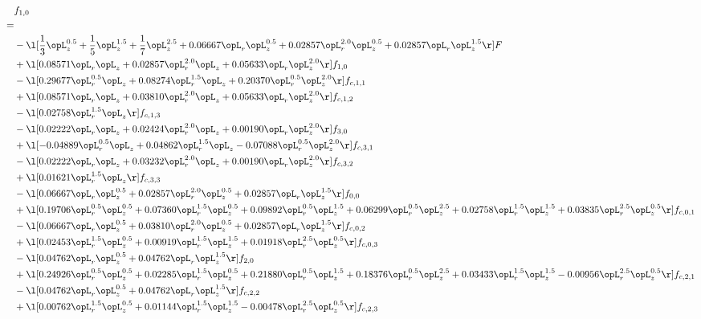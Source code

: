 \begin{alignat}{2} 
\label{eq:f_10_1} 
& f_{1,0} \nonumber \\ 
 = \\ 
& - \l[ \frac{1}{3} \opL_z^{0.5} + \frac{1}{5} \opL_z^{1.5} + \frac{1}{7} \opL_z^{2.5} +  0.06667 \opL_r \opL_z^{0.5} +  0.02857 \opL_r^{2.0} \opL_z^{0.5} +  0.02857 \opL_r \opL_z^{1.5}  \r] F \nonumber \\ 
& + \l[  0.08571 \opL_r \opL_z +  0.02857 \opL_r^{2.0} \opL_z +  0.05633 \opL_r \opL_z^{2.0}  \r] f_{1,0} \nonumber \\ 
& - \l[  0.29677 \opL_r^{0.5} \opL_z +  0.08274 \opL_r^{1.5} \opL_z +  0.20370 \opL_r^{0.5} \opL_z^{2.0}  \r] f_{c,1,1} \nonumber \\ 
& + \l[  0.08571 \opL_r \opL_z +  0.03810 \opL_r^{2.0} \opL_z +  0.05633 \opL_r \opL_z^{2.0}  \r] f_{c,1,2} \nonumber \\ 
& - \l[  0.02758 \opL_r^{1.5} \opL_z  \r] f_{c,1,3} \nonumber \\ 
& - \l[  0.02222 \opL_r \opL_z +  0.02424 \opL_r^{2.0} \opL_z +  0.00190 \opL_r \opL_z^{2.0}  \r] f_{3,0} \nonumber \\ 
& + \l[  -0.04889 \opL_r^{0.5} \opL_z +  0.04862 \opL_r^{1.5} \opL_z   -0.07088 \opL_r^{0.5} \opL_z^{2.0}  \r] f_{c,3,1} \nonumber \\ 
& - \l[  0.02222 \opL_r \opL_z +  0.03232 \opL_r^{2.0} \opL_z +  0.00190 \opL_r \opL_z^{2.0}  \r] f_{c,3,2} \nonumber \\ 
& + \l[  0.01621 \opL_r^{1.5} \opL_z  \r] f_{c,3,3} \nonumber \\ 
& - \l[  0.06667 \opL_r \opL_z^{0.5} +  0.02857 \opL_r^{2.0} \opL_z^{0.5} +  0.02857 \opL_r \opL_z^{1.5}  \r] f_{0,0} \nonumber \\ 
& + \l[  0.19706 \opL_r^{0.5} \opL_z^{0.5} +  0.07360 \opL_r^{1.5} \opL_z^{0.5} +  0.09892 \opL_r^{0.5} \opL_z^{1.5} +  0.06299 \opL_r^{0.5} \opL_z^{2.5} +  0.02758 \opL_r^{1.5} \opL_z^{1.5} +  0.03835 \opL_r^{2.5} \opL_z^{0.5}  \r] f_{c,0,1} \nonumber \\ 
& - \l[  0.06667 \opL_r \opL_z^{0.5} +  0.03810 \opL_r^{2.0} \opL_z^{0.5} +  0.02857 \opL_r \opL_z^{1.5}  \r] f_{c,0,2} \nonumber \\ 
& + \l[  0.02453 \opL_r^{1.5} \opL_z^{0.5} +  0.00919 \opL_r^{1.5} \opL_z^{1.5} +  0.01918 \opL_r^{2.5} \opL_z^{0.5}  \r] f_{c,0,3} \nonumber \\ 
& - \l[  0.04762 \opL_r \opL_z^{0.5} +  0.04762 \opL_r \opL_z^{1.5}  \r] f_{2,0} \nonumber \\ 
& + \l[  0.24926 \opL_r^{0.5} \opL_z^{0.5} +  0.02285 \opL_r^{1.5} \opL_z^{0.5} +  0.21880 \opL_r^{0.5} \opL_z^{1.5} +  0.18376 \opL_r^{0.5} \opL_z^{2.5} +  0.03433 \opL_r^{1.5} \opL_z^{1.5}   -0.00956 \opL_r^{2.5} \opL_z^{0.5}  \r] f_{c,2,1} \nonumber \\ 
& - \l[  0.04762 \opL_r \opL_z^{0.5} +  0.04762 \opL_r \opL_z^{1.5}  \r] f_{c,2,2} \nonumber \\ 
& + \l[  0.00762 \opL_r^{1.5} \opL_z^{0.5} +  0.01144 \opL_r^{1.5} \opL_z^{1.5}   -0.00478 \opL_r^{2.5} \opL_z^{0.5}  \r] f_{c,2,3} \nonumber \\ 
\end{alignat} 


